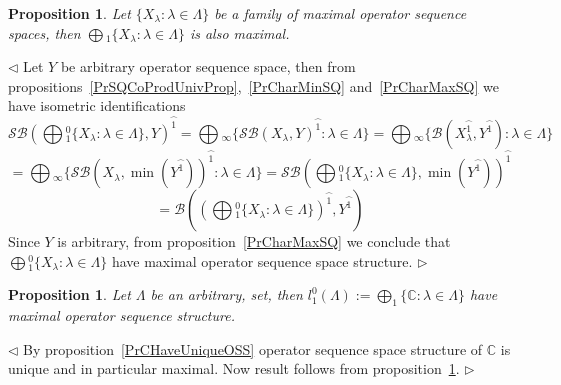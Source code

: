 \documentclass[12pt]{article}
\newtheorem{proposition}[theorem]{Proposition}
\newenvironment{proof}{\par $\triangleleft$}{$\triangleright$}
\begin{document}
\begin{proposition}\label{PrMaxCommuteWithCoprod} Let 
$ \{X_\lambda:\lambda\in\Lambda \}$ be a family of maximal operator sequence 
spaces, then $\bigoplus{}_1 \{X_\lambda:\lambda\in\Lambda \}$ is also maximal.
\end{proposition} 
\begin{proof}
Let $Y$ be arbitrary operator sequence space, then from 
propositions~\ref{PrSQCoProdUnivProp},~\ref{PrCharMinSQ} 
and~\ref{PrCharMaxSQ} we have isometric identifications
$$
\mathcal{SB}{\left(
    \bigoplus{}_1^0 \{X_\lambda:\lambda\in\Lambda \},Y
    \right)}^{\wideparen{1}}
=\bigoplus{}_\infty \{
    {\mathcal{SB}(X_\lambda,Y)}^{\wideparen{1}}:\lambda\in\Lambda
 \}
=\bigoplus{}_\infty \{
    \mathcal{B}(X_\lambda^{\wideparen{1}},Y^{\wideparen{1}}):\lambda\in\Lambda
 \}
$$
$$
=\bigoplus{}_\infty \{
    {\mathcal{SB}(X_\lambda,\min(Y^{\wideparen{1}}))}^{\wideparen{1}}
    :\lambda\in\Lambda
 \}
=\mathcal{SB}{\left(
    \bigoplus{}_1^0 \{X_\lambda:\lambda\in\Lambda \},\min(Y^{\wideparen{1}})
\right)}^{\wideparen{1}}
$$
$$
=\mathcal{B}\left(
    {\left(
        \bigoplus{}_1^0 \{X_\lambda:\lambda\in\Lambda \}
    \right)}^{\wideparen{1}},
    Y^{\wideparen{1}}
\right)
$$
Since $Y$ is arbitrary, from proposition~\ref{PrCharMaxSQ} we conclude 
that $\bigoplus{}_1^0 \{X_\lambda:\lambda\in\Lambda \}$ have maximal operator 
sequence space structure.
\end{proof}

\begin{proposition}\label{Prl1IsMax} Let $\Lambda$ be an arbitrary, set, 
then $l_1^0(\Lambda):=\bigoplus_1 \{\mathbb{C}:\lambda\in\Lambda \}$ 
have maximal operator sequence structure.
\end{proposition}
\begin{proof} By proposition~\ref{PrCHaveUniqueOSS} operator sequence space 
structure of $\mathbb{C}$ is unique and in particular maximal. Now result 
follows from proposition~\ref{PrMaxCommuteWithCoprod}.
\end{proof}
\end{document}
